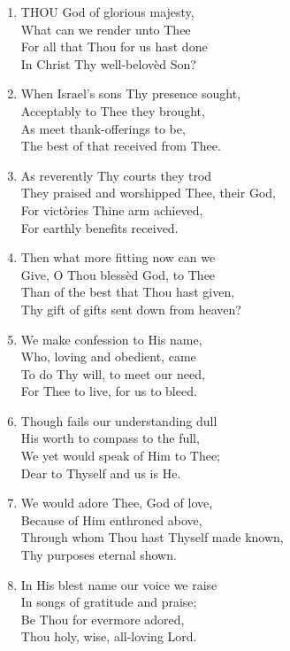 \begin{enumerate}
    \item THOU God of glorious majesty, \\
        What can we render unto Thee \\
        For all that Thou for us hast done \\
        In Christ Thy well-belov\`ed Son?

    \item When Israel's sons Thy presence sought, \\
        Acceptably to Thee they brought, \\
        As meet thank-offerings to be, \\
        The best of that received from Thee.

    \item As reverently Thy courts they trod \\
        They praised and worshipped Thee, their God, \\
        For vict\`ories Thine arm achieved, \\
        For earthly benefits received.

    \item Then what more fitting now can we \\
        Give, O Thou bless\`ed God, to Thee \\
        Than of the best that Thou hast given, \\
        Thy gift of gifts sent down from heaven?

    \item We make confession to His name, \\
        Who, loving and obedient, came \\
        To do Thy will, to meet our need, \\
        For Thee to live, for us to bleed.

    \item Though fails our understanding dull \\
        His worth to compass to the full, \\
        We yet would speak of Him to Thee; \\
        Dear to Thyself and us is He.

    \item We would adore Thee, God of love, \\
        Because of Him enthroned above, \\
        Through whom Thou hast Thyself made known, \\
        Thy purposes eternal shown.

    \item In His blest name our voice we raise \\
        In songs of gratitude and praise; \\
        Be Thou for evermore adored, \\
        Thou holy, wise, all-loving Lord.

\end{enumerate}

